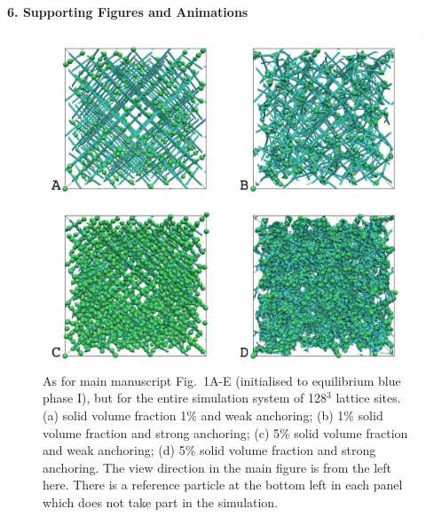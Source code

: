 \documentclass[12pt,twoside]{article}
\begin{document}

{\bf 6. Supporting Figures and Animations}



\begin{figure}
\begin{center}
\includegraphics[scale=0.35]{s1.jpg}
\end{center}
\caption{As for main manuscript Fig.~1A-E (initialised to equilibrium blue
phase I), but for the entire simulation system of 128$^3$ lattice sites. (a) 
solid volume fraction 1\% and weak anchoring; 
(b) 1\% solid volume fraction and strong anchoring;
(c) 5\% solid volume fraction and weak anchoring; (d) 5\% solid
volume fraction and strong anchoring. The view direction in the
main figure is from the left here. There is a reference
particle at the bottom left in each panel which does not take part
in the simulation.}
\end{figure}
\end{document}
